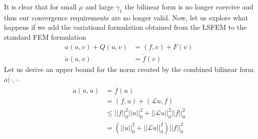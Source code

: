 It is clear that for small $\mu$ and large $\gamma_1$ the bilinear form is no longer coercive and thus our convergence requirements are no longer valid. 
Now, let us explore what happens if we add the variational formulation obtained from the LSFEM to the standard FEM formulation
\begin{align}
	a(u,v) + Q(u,v) &= (f,v) + F(v) \\
	\mathring{a}(u,v) &= \mathring{f}(v)
	\label{eq:GLS}
\end{align}
Let us derive an upper bound for the norm created by the combined bilinear form $\mathring{a(\cdot,\cdot}$. 
\begin{align}
	\mathring{a}(u,u) &= \mathring{f}(u) \\
	&= (f,u)+(\mathcal{L}u,f)\\
	&\leq ||f||^2_0 ||u||^2_0 + ||\mathcal{L}u||^2_0 ||f||^2_0\\
	&= (||u||^2_0 + ||\mathcal{L}u||^2_0) ||f||^2_0
	\label{eq:GLS}
\end{align}


